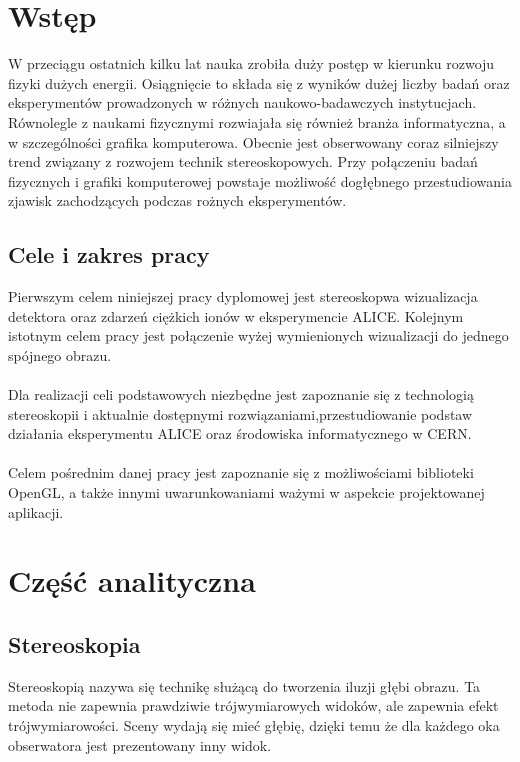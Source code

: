 
\graphicspath{{images/}}




\tableofcontents
\thispagestyle{empty}
\thesisstyle
\newpage 

\section[Wstęp]{Wstęp}
W przeciągu ostatnich kilku lat nauka zrobiła duży postęp w kierunku rozwoju fizyki dużych energii. Osiągnięcie to składa się z wyników dużej liczby badań oraz eksperymentów prowadzonych w różnych naukowo-badawczych instytucjach. Równolegle z naukami fizycznymi rozwiajała się również branża informatyczna, a w szczególności grafika komputerowa. Obecnie jest obserwowany coraz silniejszy trend związany z rozwojem technik stereoskopowych. Przy połączeniu badań fizycznych i grafiki komputerowej powstaje możliwość dogłębnego przestudiowania zjawisk zachodzących podczas rożnych eksperymentów.


\subsection{Cele i zakres pracy}
Pierwszym celem niniejszej pracy dyplomowej jest stereoskopwa wizualizacja detektora oraz zdarzeń ciężkich ionów w eksperymencie ALICE. Kolejnym istotnym celem pracy jest połączenie wyżej wymienionych wizualizacji do jednego spójnego obrazu. 
\paragraph{}
Dla realizacji celi podstawowych niezbędne jest zapoznanie się z technologią stereoskopii i aktualnie dostępnymi rozwiązaniami,przestudiowanie podstaw działania eksperymentu ALICE oraz środowiska informatycznego w CERN. \paragraph{}
Celem pośrednim danej pracy jest zapoznanie się z możliwościami biblioteki OpenGL, a także innymi uwarunkowaniami ważymi w aspekcie projektowanej aplikacji.

\newpage
\section[Część analityczna]{Część analityczna}

\subsection{Stereoskopia}
Stereoskopią nazywa się technikę służącą do tworzenia iluzji głębi obrazu. Ta metoda nie zapewnia prawdziwie trójwymiarowych widoków, ale zapewnia efekt trójwymiarowości. Sceny wydają się mieć głębię, dzięki temu że dla każdego oka obserwatora jest prezentowany inny widok. 
